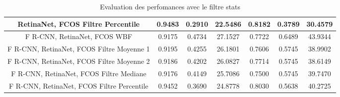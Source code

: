 \documentclass{article}
\begin{document}
\begin{table}[h!]
\begin{tabular}{|c||c|c|c||c|c|c|}
\hline
RetinaNet, FCOS Filtre Percentile & 0.9483 & 0.2910 & 22.5486 & 0.8182 & 0.3789 & 30.4579 \\ 
\hline
F R-CNN, RetinaNet, FCOS WBF & 0.9175 & 0.4734 & 27.1527 & 0.7722 & 0.6489 & 43.9344 \\ 
\hline
F R-CNN, RetinaNet, FCOS Filtre Moyenne 1 & 0.9195 & 0.4255 & 26.1801 & 0.7606 & 0.5745 & 38.9902 \\ 
\hline
F R-CNN, RetinaNet, FCOS Filtre Moyenne 2 & 0.9186 & 0.4202 & 26.0827 & 0.7714 & 0.5745 & 38.6149 \\ 
\hline
F R-CNN, RetinaNet, FCOS Filtre Mediane & 0.9176 & 0.4149 & 25.7086 & 0.7500 & 0.5745 & 39.7470 \\ 
\hline
F R-CNN, RetinaNet, FCOS Filtre Percentile & 0.9452 & 0.3690 & 24.8778 & 0.8030 & 0.5638 & 40.2725 \\ 
\hline
\end{tabular}
\caption{Evaluation des perfomances avec le filtre stats}
\label{table:data}
\end{table}
\end{document}
